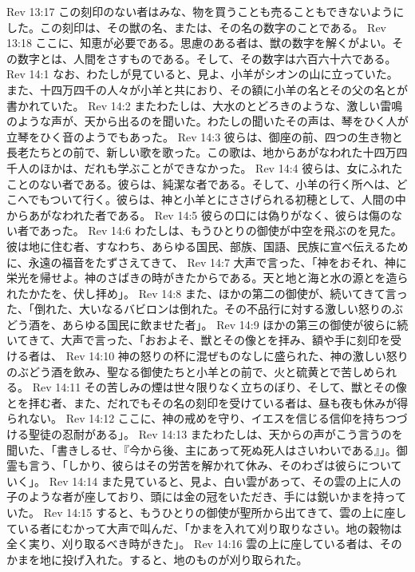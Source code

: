 Rev 13:17  この刻印のない者はみな、物を買うことも売ることもできないようにした。この刻印は、その獣の名、または、その名の数字のことである。
Rev 13:18  ここに、知恵が必要である。思慮のある者は、獣の数字を解くがよい。その数字とは、人間をさすものである。そして、その数字は六百六十六である。
Rev 14:1  なお、わたしが見ていると、見よ、小羊がシオンの山に立っていた。また、十四万四千の人々が小羊と共におり、その額に小羊の名とその父の名とが書かれていた。
Rev 14:2  またわたしは、大水のとどろきのような、激しい雷鳴のような声が、天から出るのを聞いた。わたしの聞いたその声は、琴をひく人が立琴をひく音のようでもあった。
Rev 14:3  彼らは、御座の前、四つの生き物と長老たちとの前で、新しい歌を歌った。この歌は、地からあがなわれた十四万四千人のほかは、だれも学ぶことができなかった。
Rev 14:4  彼らは、女にふれたことのない者である。彼らは、純潔な者である。そして、小羊の行く所へは、どこへでもついて行く。彼らは、神と小羊とにささげられる初穂として、人間の中からあがなわれた者である。
Rev 14:5  彼らの口には偽りがなく、彼らは傷のない者であった。
Rev 14:6  わたしは、もうひとりの御使が中空を飛ぶのを見た。彼は地に住む者、すなわち、あらゆる国民、部族、国語、民族に宣べ伝えるために、永遠の福音をたずさえてきて、
Rev 14:7  大声で言った、「神をおそれ、神に栄光を帰せよ。神のさばきの時がきたからである。天と地と海と水の源とを造られたかたを、伏し拝め」。
Rev 14:8  また、ほかの第二の御使が、続いてきて言った、「倒れた、大いなるバビロンは倒れた。その不品行に対する激しい怒りのぶどう酒を、あらゆる国民に飲ませた者」。
Rev 14:9  ほかの第三の御使が彼らに続いてきて、大声で言った、「おおよそ、獣とその像とを拝み、額や手に刻印を受ける者は、
Rev 14:10  神の怒りの杯に混ぜものなしに盛られた、神の激しい怒りのぶどう酒を飲み、聖なる御使たちと小羊との前で、火と硫黄とで苦しめられる。
Rev 14:11  その苦しみの煙は世々限りなく立ちのぼり、そして、獣とその像とを拝む者、また、だれでもその名の刻印を受けている者は、昼も夜も休みが得られない。
Rev 14:12  ここに、神の戒めを守り、イエスを信じる信仰を持ちつづける聖徒の忍耐がある」。
Rev 14:13  またわたしは、天からの声がこう言うのを聞いた、「書きしるせ、『今から後、主にあって死ぬ死人はさいわいである』」。御霊も言う、「しかり、彼らはその労苦を解かれて休み、そのわざは彼らについていく」。
Rev 14:14  また見ていると、見よ、白い雲があって、その雲の上に人の子のような者が座しており、頭には金の冠をいただき、手には鋭いかまを持っていた。
Rev 14:15  すると、もうひとりの御使が聖所から出てきて、雲の上に座している者にむかって大声で叫んだ、「かまを入れて刈り取りなさい。地の穀物は全く実り、刈り取るべき時がきた」。
Rev 14:16  雲の上に座している者は、そのかまを地に投げ入れた。すると、地のものが刈り取られた。
